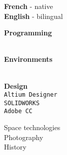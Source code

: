 \documentclass[9pt]{developercv} %
\begin{document}
\begin{minipage}[t]{0.18\textwidth}
		\textbf{French} - native\\
		\textbf{English} - bilingual

		\textbf{Programming}
		\begin{barchart}{1.75}
		\end{barchart}
		\\
		\textbf{Environments}
		\begin{barchart}{1.75}
		\end{barchart}
		\\
		\textbf{Design}\\
		\texttt{Altium Designer}\\
		\texttt{SOLIDWORKS}\\
		\texttt{Adobe CC}

		Space technologies\\
		Photography\\
		History
\end{minipage}

\end{document}
